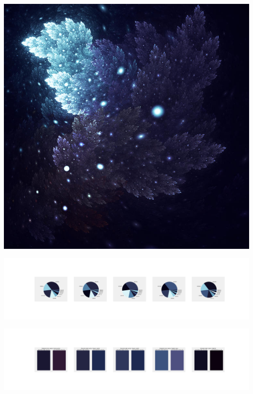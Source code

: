 \documentclass[11pt]{article}
\begin{document}
\begin{landscape}
    \begin{center}
    \includegraphics[width=\textwidth]{./nbimg/file (150).jpg}
    \end{center}

    \begin{center}
    \includegraphics[width=250mm]{./nbimg/pie-57.jpg}
    \end{center}

    \begin{center}
    \includegraphics[width=250mm]{./nbimg/peak-57.jpg}
    \end{center}
    


\end{landscape}
\end{document}
